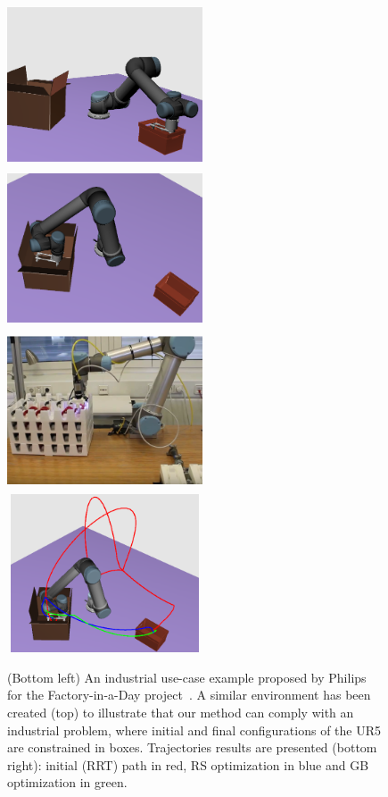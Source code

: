 \documentclass{tADR2e}
\begin{document}
\begin{figure}[t]
	\centering
	\includegraphics[width=5.8cm,height=4.7cm]{fiad_qinit.png}
	\includegraphics[width=5.8cm,height=4.7cm]{fiad_qfinal.png}\\
	\includegraphics[width=5.8cm,height=4.7cm]{fiad_real.png}
	\includegraphics[width=5.8cm,height=4.7cm]{fiad-trajectorires.png}
	\caption{(Bottom left) An industrial use-case example proposed by Philips for 	
	the Factory-in-a-Day project~\cite{factory-day-video}. A similar environment 	
	has been created (top) to illustrate that our method can comply with an 
	industrial problem, where initial and final configurations of the UR5 are 
	constrained in boxes. Trajectories results 
	are presented (bottom right): initial (RRT) path in red, RS optimization in 
	blue and GB optimization in green.}
	\label{fiad}
\end{figure}
\end{document}
